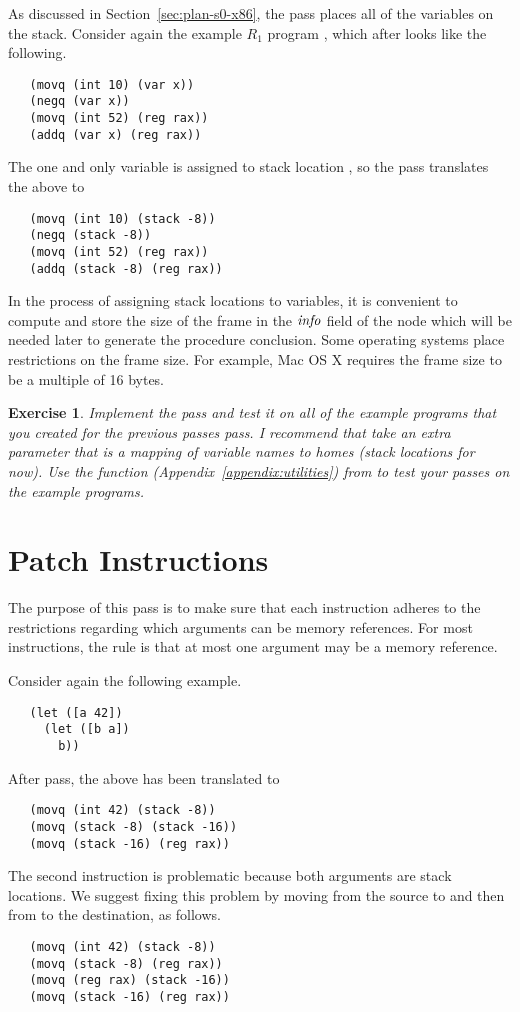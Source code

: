 \documentclass[11pt]{book}
\newtheorem{exercise}[theorem]{Exercise}
\begin{document}
As discussed in Section~\ref{sec:plan-s0-x86}, the
 pass places all of the variables on the stack.
Consider again the example $R_1$ program ,
which after  looks like the following.
\begin{lstlisting}
   (movq (int 10) (var x))
   (negq (var x))
   (movq (int 52) (reg rax))
   (addq (var x) (reg rax))
\end{lstlisting}
The one and only variable  is assigned to stack location
, so the  pass translates the
above to
\begin{lstlisting}
   (movq (int 10) (stack -8))
   (negq (stack -8))
   (movq (int 52) (reg rax))
   (addq (stack -8) (reg rax))
\end{lstlisting}

In the process of assigning stack locations to variables, it is
convenient to compute and store the size of the frame in the
$\mathit{info}$ field of the  node which will be needed
later to generate the procedure conclusion. Some operating systems
place restrictions on the frame size. For example, Mac OS X requires
the frame size to be a multiple of 16 bytes.

\begin{exercise}
\normalfont Implement the  pass and test it on all
of the example programs that you created for the previous passes pass.
I recommend that  take an extra parameter that is a
mapping of variable names to homes (stack locations for now).  Use the
 function (Appendix~\ref{appendix:utilities}) from
 to test your passes on the example programs.
\end{exercise}

\section{Patch Instructions}
\label{sec:patch-s0}

The purpose of this pass is to make sure that each instruction adheres
to the restrictions regarding which arguments can be memory
references. For most instructions, the rule is that at most one
argument may be a memory reference.

Consider again the following example.
\begin{lstlisting}
   (let ([a 42])
     (let ([b a])
       b))
\end{lstlisting}
After  pass, the above has been translated to
\begin{lstlisting}
   (movq (int 42) (stack -8))
   (movq (stack -8) (stack -16))
   (movq (stack -16) (reg rax))
\end{lstlisting}
The second  instruction is problematic because both arguments
are stack locations. We suggest fixing this problem by moving from the
source to  and then from  to the destination, as
follows.
\begin{lstlisting}
   (movq (int 42) (stack -8))
   (movq (stack -8) (reg rax))
   (movq (reg rax) (stack -16))
   (movq (stack -16) (reg rax))
\end{lstlisting}
\end{document}
